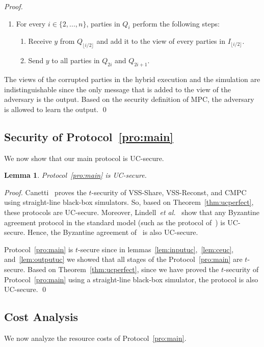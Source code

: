 \documentclass[11pt,letter]{article}
\newcommand{\etal}{\emph{et al.}}
\newcommand{\alg}[1]{\mbox{\textsf{#1}}}
\theoremstyle{mytheoremstyle}
\newtheorem{lemma}{Lemma}
\begin{document}
\begin{proof}
\begin{algorithm}
\begin{enumerate}
			\item For every $i \in \{2,...,n\}$, parties in $Q_i$ perform the following steps:
					\smallskip
					\begin{enumerate}
						\item Receive $y$ from $Q_{\lfloor i/2\rfloor}$ and add it to the view of every parties in $I_{\lfloor i/2\rfloor}$.
						\item Send $y$ to all parties in $Q_{2i}$ and	$Q_{2i+1}$.
					\end{enumerate}		
		\end{enumerate}
	\end{algorithm}		
	The views of the corrupted parties in the hybrid execution and the simulation are indistinguishable since the only message that is added to the view of the adversary is the output. Based on the security definition of MPC, the adversary is allowed to learn the output.
	\qed
\end{proof}

\subsection{Security of Protocol~\ref{pro:main}}
We now show that our main protocol is UC-secure.

\begin{lemma} \label{lem:step2}
	Protocol~\ref{pro:main} is UC-secure.
\end{lemma}
\begin{proof}
	Canetti~\cite{canetti:studies} proves the $t$-security of \alg{VSS-Share}, \alg{VSS-Reconst}, and \alg{CMPC} using straight-line black-box simulators. So, based on Theorem~\ref{thm:ucperfect}, these protocols are UC-secure. Moreover, Lindell~\etal~\cite{Lindell:2006:CAB:1217856.1217857} show that any Byzantine agreement protocol in the standard model (such as the protocol of~\cite{canetti}) is UC-secure. Hence, the Byzantine agreement of~\cite{Feldman:1988:OAB:62212.62225} is also UC-secure.
	
	Protocol~\ref{pro:main} is $t$-secure since in lemmas~\ref{lem:inputuc},~\ref{lem:ceuc}, and~\ref{lem:outputuc} we showed that all stages of the Protocol~\ref{pro:main} are $t$-secure.
	Based on Theorem~\ref{thm:ucperfect}, since we have proved the \mbox{$t$-security} of Protocol~\ref{pro:main} using a straight-line black-box simulator, the protocol is also UC-secure.
	\qed
\end{proof}



\subsection{Cost Analysis} \label{sec:costAnalysis}
We now analyze the resource costs of Protocol~\ref{pro:main}.
\end{document}
